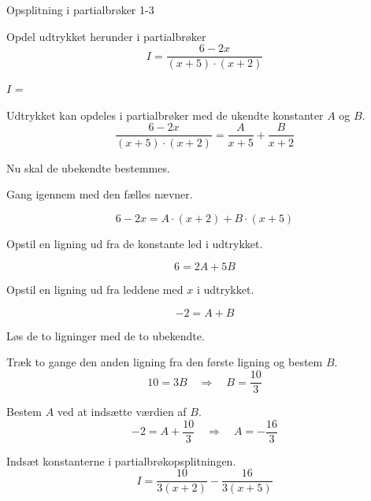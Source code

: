 \documentclass{article}
\begin{document}
\begin{exercise}{Opsplitning i partialbrøker 1-3}

Opdel udtrykket herunder i partialbrøker
\[
I = \frac{6 - 2x}{(x + 5) \cdot (x + 2)}
\]

$I$ = 

\hint
Udtrykket kan opdeles i partialbrøker med de ukendte konstanter $A$ og $B$.
\[
\frac{6 - 2x}{(x + 5) \cdot (x + 2)} =
\frac{A}{x + 5} + \frac{B}{x + 2}
\]

\hint
Nu skal de ubekendte bestemmes.

\hint
Gang igennem med den fælles nævner.

\hint
\[
6 - 2x = A \cdot (x + 2) + B \cdot (x + 5)
\]

\hint
Opstil en ligning ud fra de konstante led i udtrykket.

\hint
\[
6 = 2A + 5B
\]

\hint
Opstil en ligning ud fra leddene med $x$ i udtrykket.

\hint
\[
-2 = A + B
\]

\hint
Løs de to ligninger med de to ubekendte.

\hint
Træk to gange den anden ligning fra den første ligning og bestem $B$.
\[
10 = 3B \quad \Rightarrow \quad B = \frac{10}{3}
\]

\hint
Bestem $A$ ved at indsætte værdien af $B$.
\[
-2 = A + \frac{10}{3} \quad \Rightarrow\quad A = - \frac{16}{3}
\]

\hint
Indsæt konstanterne i partialbrøkopsplitningen.
\[
I = \frac{10}{3(x + 2)} - \frac{16}{3(x + 5)}
\]



\end{exercise}
\end{document}
